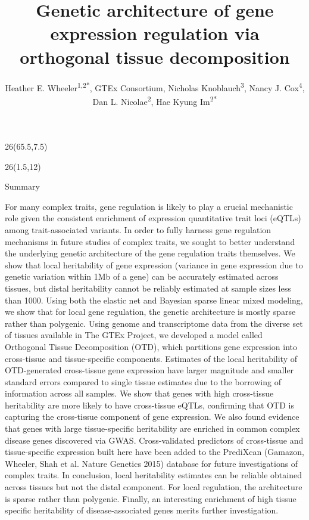 \documentclass[final]{beamer}
\title{Genetic architecture of gene expression regulation via orthogonal tissue decomposition}
\author{Heather E. Wheeler\textsuperscript{1,2*}, GTEx Consortium, Nicholas Knoblauch\textsuperscript{3},  Nancy J. Cox\textsuperscript{4}, Dan L. Nicolae\textsuperscript{2}, Hae Kyung Im\textsuperscript{2*}}
\institute{\small{\textsuperscript{1}Departments of Biology and Computer Science, Loyola University Chicago; \textsuperscript{2}Department of Medicine, University of Chicago, Chicago, IL;\\\textsuperscript{3}Committee on Genetics, Genomics, and Systems Biology, University of Chicago; \textsuperscript{4}Division of Genetic Medicine, Vanderbilt University}}
\date{}
\newcommand{\VcoordTop}{12}
\newcommand{\HcoordFirst}{1.5}
\newcommand{\ColWidth}{26}
\begin{document}
\begin{frame}{} 

% 
\begin{textblock}{\ColWidth}(65.5,7.5)%
\end{textblock}



%
%

\begin{textblock}{\ColWidth}(\HcoordFirst,\VcoordTop)

\begin{block}{Summary}
\begin{footnotesize}

For many complex traits, gene regulation is likely to play a crucial mechanistic role given the consistent enrichment of expression quantitative trait loci (eQTLs) among trait-associated variants. In order to fully harness gene regulation mechanisms in future studies of complex traits, we sought to better understand the underlying genetic architecture of the gene regulation traits themselves. We show that local heritability of gene expression (variance in gene expression due to genetic variation within 1Mb of a gene) can be accurately estimated across tissues, but distal heritability cannot be reliably estimated at sample sizes less than 1000. Using both the elastic net and Bayesian sparse linear mixed modeling, we show that for local gene regulation, the genetic architecture is mostly sparse rather than polygenic. Using genome and transcriptome data from the diverse set of tissues available in The GTEx Project, we developed a model called Orthogonal Tissue Decomposition (OTD), which partitions gene expression into cross-tissue and tissue-specific components. Estimates of the local heritability of OTD-generated cross-tissue gene expression have larger magnitude and smaller standard errors compared to single tissue estimates due to the borrowing of information across all samples. We show that genes with high cross-tissue heritability are more likely to have cross-tissue eQTLs, confirming that OTD is capturing the cross-tissue component of gene expression. We also found evidence that genes with large tissue-specific heritability are enriched in common complex disease genes discovered via GWAS. Cross-validated predictors of cross-tissue and tissue-specific expression built here have been added to the PrediXcan (Gamazon, Wheeler, Shah et al. Nature Genetics 2015) database for future investigations of complex traits. In conclusion, local heritability estimates can be reliable obtained across tissues but not the distal component. For local regulation, the architecture is sparse rather than polygenic. Finally, an interesting enrichment of high tissue specific heritability of disease-associated genes merits further investigation.


\end{footnotesize}
\end{block}
\end{textblock}
\end{frame}
\end{document}
